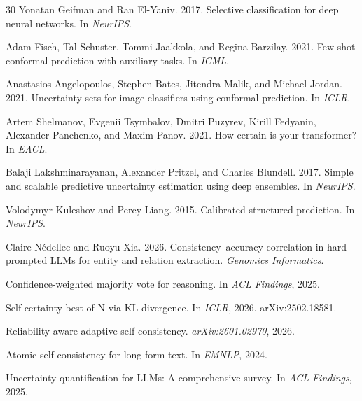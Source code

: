\documentclass[11pt,a4paper]{article}
\begin{document}
\begin{thebibliography}{30}
Yonatan Geifman and Ran El-Yaniv. 2017.
\newblock Selective classification for deep neural networks.
\newblock In \emph{NeurIPS}.

Adam Fisch, Tal Schuster, Tommi Jaakkola, and Regina Barzilay. 2021.
\newblock Few-shot conformal prediction with auxiliary tasks.
\newblock In \emph{ICML}.

Anastasios Angelopoulos, Stephen Bates, Jitendra Malik, and Michael Jordan. 2021.
\newblock Uncertainty sets for image classifiers using conformal prediction.
\newblock In \emph{ICLR}.

Artem Shelmanov, Evgenii Tsymbalov, Dmitri Puzyrev, Kirill Fedyanin, Alexander Panchenko, and Maxim Panov. 2021.
\newblock How certain is your transformer?
\newblock In \emph{EACL}.

Balaji Lakshminarayanan, Alexander Pritzel, and Charles Blundell. 2017.
\newblock Simple and scalable predictive uncertainty estimation using deep ensembles.
\newblock In \emph{NeurIPS}.

Volodymyr Kuleshov and Percy Liang. 2015.
\newblock Calibrated structured prediction.
\newblock In \emph{NeurIPS}.

Claire N\'{e}dellec and Ruoyu Xia. 2026.
\newblock Consistency--accuracy correlation in hard-prompted LLMs for entity and relation extraction.
\newblock \emph{Genomics Informatics}.

Confidence-weighted majority vote for reasoning.
\newblock In \emph{ACL Findings}, 2025.

Self-certainty best-of-N via KL-divergence.
\newblock In \emph{ICLR}, 2026. arXiv:2502.18581.

Reliability-aware adaptive self-consistency.
\newblock \emph{arXiv:2601.02970}, 2026.

Atomic self-consistency for long-form text.
\newblock In \emph{EMNLP}, 2024.

Uncertainty quantification for LLMs: A comprehensive survey.
\newblock In \emph{ACL Findings}, 2025.


\end{thebibliography}
\end{document}
